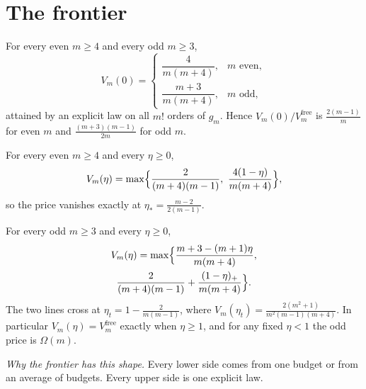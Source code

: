 \section{The frontier}
\label{sec:frontier}

\begin{theorem}
\label{thm:zero}
For every even $m\ge4$ and every odd $m\ge3$,
\[
V_{m}(0)=
\begin{cases}
\dfrac{4}{m(m+4)}, & m\text{ even},\\[8pt]
\dfrac{m+3}{m(m+4)}, & m\text{ odd},
\end{cases}
\]
attained by an explicit law on all $m!$ orders of $g_{m}$. Hence
$V_{m}(0)/V^{\mathrm{free}}_{m}$ is $\frac{2(m-1)}{m}$ for even $m$ and
$\frac{(m+3)(m-1)}{2m}$ for odd $m$.
\end{theorem}


\begin{theorem}
\label{thm:even}
For every even $m\ge4$ and every $\eta\ge0$,
\[
V_{m}(\eta)=\max\Bigl\{\frac{2}{(m+4)(m-1)},\ \frac{4(1-\eta)}{m(m+4)}\Bigr\},
\]
so the price vanishes exactly at $\eta_{*}=\frac{m-2}{2(m-1)}$.
\end{theorem}


\begin{theorem}
\label{thm:odd}
For every odd $m\ge3$ and every $\eta\ge0$,
\begin{multline*}
V_{m}(\eta)=\max\Bigl\{\frac{m+3-(m+1)\eta}{m(m+4)},\\
\frac{2}{(m+4)(m-1)}+\frac{(1-\eta)_{+}}{m(m+4)}\Bigr\}.
\end{multline*}
The two lines cross at $\eta_{t}=1-\frac{2}{m(m-1)}$, where
$V_{m}(\eta_{t})=\frac{2(m^{2}+1)}{m^{2}(m-1)(m+4)}$. In particular
$V_{m}(\eta)=V^{\mathrm{free}}_{m}$ exactly when $\eta\ge1$, and for any fixed $\eta<1$ the
odd price is $\Omega(m)$.
\end{theorem}


\emph{Why the frontier has this shape.} Every lower side comes from one budget or from an
average of budgets. Every upper side is one explicit law.

